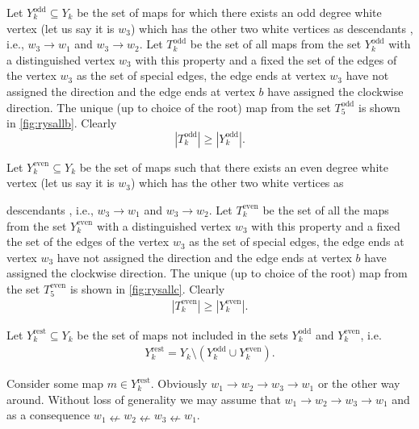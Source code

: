 \documentclass[submission]{FPSAC2021}
\DeclareMathOperator{\odd}{odd}
\DeclareMathOperator{\even}{even}
\DeclareMathOperator{\rest}{rest}
\newcommand{\successors}
{
	descendants
}
\begin{document}
Let $Y_{k}^{\odd}\subseteq Y_k$ be the 
set of maps for which there exists an
odd degree white vertex (let us say it 
is $w_3$) which has the other two white
vertices as \successors, i.e., 
$w_3\rightarrow w_1$ and 
$w_3\rightarrow w_2$. Let $T_k^{\odd}$ 
be the set of all maps from the set
$Y_k^{\odd}$ with a distinguished 
vertex $w_3$ with this property and a 
fixed the set of the edges of the 
vertex $w_3$ as the set of special edges, 
the edge ends at vertex $w_3$ have not assigned 
the direction and the edge ends at vertex 
$b$ have assigned the clockwise direction. 
The unique (up to choice of the root) 
map from the set $T_{5}^{\odd}$ is 
shown in \cref{fig:rysallb}. Clearly
\begin{equation}
\label{ineqodd}
|T_{k}^{\odd}| \geq |Y_{k}^{\odd}|.
\end{equation}

Let $Y_{k}^{\even}\subseteq Y_k$ be 
the set of maps such that there
exists an even degree white vertex 
(let us say it is $w_3$) which has 
the other two white vertices as 
\successors, i.e., 
$w_3\rightarrow w_1$ and 
$w_3\rightarrow w_2$. 
Let $T_k^{\even}$ be the set of all 
the maps from the set $Y_k^{\even}$ 
with a distinguished 
vertex $w_3$ with this property and a 
fixed the set of the edges of the 
vertex $w_3$ as the set of special edges, 
the edge ends at vertex $w_3$ have not assigned
the direction and the edge ends at vertex 
$b$ have assigned the clockwise direction. 
The unique (up to choice of 
the root) map from the set $T_{5}^{\even}$ 
is shown in \cref{fig:rysallc}. Clearly
\begin{align}
\label{ineqeven}
|T_{k}^{\even}| \geq |Y_{k}^{\even}|.
\end{align}

Let $Y_{k}^{\rest}\subseteq Y_k$ be 
the set of maps not included in the
sets $Y_{k}^{\odd}$ and 
$Y_{k}^{\even}$, i.e. 
\begin{align}
\label{yrestdef}
Y_{k}^{\rest}=Y_k 
\setminus (Y_{k}^{\odd} 
\cup Y_{k}^{\even}).
\end{align}

Consider some map $m\in Y_{k}^{\rest}$. 
Obviously $w_1 \rightarrow w_2 
\rightarrow w_3 \rightarrow w_1$ or the 
other way around. Without  loss  of  
generality  we  may  assume  that 
$w_1 \rightarrow w_2 \rightarrow w_3 
\rightarrow w_1$ and as a consequence 
$w_1 \nleftarrow w_2 \nleftarrow w_3 
\nleftarrow w_1$.
\end{document}
